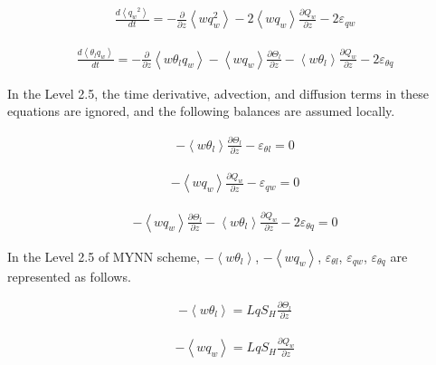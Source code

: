 \begin{eqnarray}
\frac{d\left\langle {q_w}^{2}\right\rangle}{d t}=-\frac{\partial}{\partial z}\left\langle w q_{w}^{2}\right\rangle-2\left\langle w q_{w}\right\rangle \frac{\partial Q_{w}}{\partial z}-2 \varepsilon_{q w}
\end{eqnarray}

\begin{eqnarray}
\frac{d\left\langle\theta_{l} q_{w}\right\rangle}{d t}=-\frac{\partial}{\partial z}\left\langle w \theta_{l} q_{w}\right\rangle-\left\langle w q_{w}\right\rangle \frac{\partial \Theta_{l}}{\partial z}-\left\langle w \theta_{l}\right\rangle \frac{\partial Q_{w}}{\partial z}-2 \varepsilon_{\theta q}
\end{eqnarray}

In the Level 2.5, the time derivative, advection, and diffusion terms in
these equations are ignored, and the following balances are assumed
locally.

\begin{eqnarray} -\left\langle w \theta_{l}\right\rangle \frac{\partial \Theta_{l}}{\partial z}-\varepsilon_{\theta l} = 0 \tag{p-dif.6}\end{eqnarray}

\begin{eqnarray} -\left\langle w q_{w}\right\rangle \frac{\partial Q_{w}}{\partial z}-\varepsilon_{q w} = 0 \tag{p-dif.7}\end{eqnarray}

\begin{eqnarray} -\left\langle w q_{w}\right\rangle \frac{\partial \Theta_{l}}{\partial z}-\left\langle w \theta_{l}\right\rangle \frac{\partial Q_{w}}{\partial z}-2 \varepsilon_{\theta q} = 0 \tag{p-dif.8}\end{eqnarray}

In the Level 2.5 of MYNN scheme,
\(-\left\langle w \theta_{l}\right\rangle\),
\(-\left\langle w q_{w}\right\rangle\), \(\varepsilon_{\theta l}\),
\(\varepsilon_{q w}\), \(\varepsilon_{\theta q}\) are represented as
follows.

\begin{eqnarray} -\left\langle w \theta_{l}\right\rangle = LqS_H \frac{\partial \Theta_{l}}{\partial z} \tag{p-dif.9}\end{eqnarray}

\begin{eqnarray} -\left\langle w q_{w}\right\rangle = LqS_H \frac{\partial Q_{w}}{\partial z} \tag{p-dif.10}\end{eqnarray}

